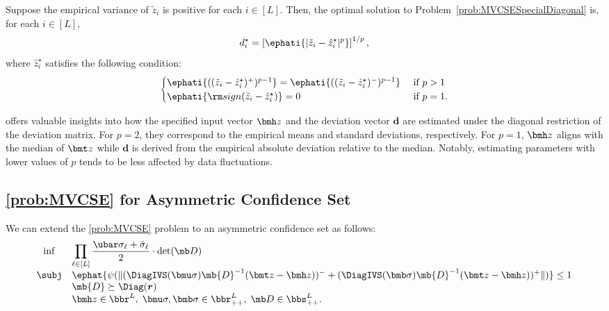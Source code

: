\documentclass[mnsc, nonblindrev]{informswp}
\newcommand{\1}[1]{\mathds{1}{\left(#1\right)}}
\begin{document}
\begin{theorem}
\label{chap8:thm:MinimumVolumeSpecialDiagonal}
Suppose the empirical variance of $\tilde z_i$ is positive for each $i \in [L]$. Then, the optimal solution to Problem~\eqref{prob:MVCSESpecialDiagonal} is, for each $i \in [L]$,  
$$
d^\star_i = \left[\ephati{|\tilde z_i - \hat z^\star_i|^p}\right]^{1/p},
$$
where $\hat z^\star_i$ satisfies the following condition:
$$
\begin{cases}
\ephati{((\tilde z_i - \hat z^\star_i)^{+})^{p-1}} = \ephati{((\tilde z_i - \hat z^\star_i)^{-})^{p-1}} &~\text{if}~ p > 1 \\
\ephati{{\rm sign}(\tilde z_i - \hat z^\star_i)} = 0 &~\text{if}~ p = 1.
\end{cases}
$$
\end{theorem}

 offers valuable insights into how the specified input vector $\bmh z$ and the deviation vector $\bm d$ are estimated under the diagonal restriction of the deviation matrix. For $p=2$, they correspond to the empirical means and standard deviations, respectively. For $p=1$, $\bmh z$ aligns with the median of $\bmt z$ while $\bm d$ is derived from the empirical absolute deviation relative to the median. Notably, estimating parameters with lower values of $p$ tends to be less affected by data fluctuations.

\subsection{\ref{prob:MVCSE} for Asymmetric Confidence Set}
\label{sec:MVCSE_Asymmetric_Region}
We can extend the \ref{prob:MVCSE} problem to an asymmetric confidence set as follows:
\begin{equation}
\label{prob:MVCSEAsymmetricRegionEstimation}
\begin{array}{cll}
\inf & \displaystyle \prod_{\ell \in [L]} \frac{\ubar \sigma_{\ell} + \bar \sigma_{\ell}}{2} \cdot \det(\mb D) \\
\subj & \displaystyle\ephat{\psi(\|(\DiagIVS(\bmu \sigma) \mb{D}^{-1} (\bmt z - \bmh z))^- + (\DiagIVS(\bmb \sigma) \mb{D}^{-1} (\bmt z - \bmh z ))^+\|)} \leq 1 \\
& \mb{D} \succeq \Diag(\bm r) \\
& \bmh z \in \bbr^L, \; \bmu \sigma,\bmb \sigma \in \bbr^L_{++}, \; \mb D \in \bbs^L_{++}.  
\end{array} 
\end{equation}
\end{document}
